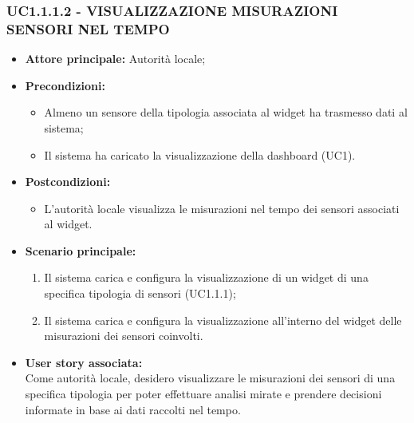 \subsubsection{UC1.1.1.2 - VISUALIZZAZIONE MISURAZIONI SENSORI NEL TEMPO}
\begin{itemize}
    \item \textbf{Attore principale:} Autorità locale;
    \item \textbf{Precondizioni:}
        \begin{itemize}
            \item Almeno un sensore della tipologia associata al widget ha trasmesso dati al sistema;
            \item Il sistema ha caricato la visualizzazione della dashboard (UC1).
        \end{itemize}
    \item \textbf{Postcondizioni:}
        \begin{itemize}
            \item  L'autorità locale visualizza le misurazioni nel tempo dei sensori associati al widget.
        \end{itemize}
    \item \textbf{Scenario principale:}
        \begin{enumerate}
            \item Il sistema carica e configura la visualizzazione di un widget di una specifica tipologia di sensori (UC1.1.1);
            \item Il sistema carica e configura la visualizzazione all'interno del widget delle misurazioni dei sensori coinvolti.
        \end{enumerate}
    \item \textbf{User story associata:} \\
        Come autorità locale, desidero visualizzare le misurazioni dei sensori di una specifica tipologia per poter effettuare analisi mirate e prendere decisioni informate in base ai dati raccolti nel tempo.
\end{itemize}
